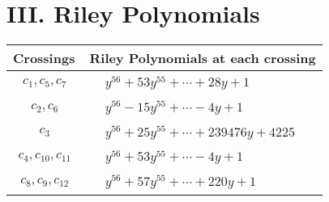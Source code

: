 \documentclass[1p]{elsarticle_modified}
\theoremstyle{definition}
\begin{document}
\centering \section*{ III. Riley Polynomials}
\begin{tabular}{m{50pt}|m{274pt}}
Crossings & \hspace{64pt}Riley Polynomials at each crossing \\
\hline $$\begin{aligned}c_{1},c_{5},c_{7}\end{aligned}$$&$\begin{aligned}
&y^{56}+53 y^{55}+\cdots+28 y+1
\end{aligned}$\\
\hline $$\begin{aligned}c_{2},c_{6}\end{aligned}$$&$\begin{aligned}
&y^{56}-15 y^{55}+\cdots-4 y+1
\end{aligned}$\\
\hline $$\begin{aligned}c_{3}\end{aligned}$$&$\begin{aligned}
&y^{56}+25 y^{55}+\cdots+239476 y+4225
\end{aligned}$\\
\hline $$\begin{aligned}c_{4},c_{10},c_{11}\end{aligned}$$&$\begin{aligned}
&y^{56}+53 y^{55}+\cdots-4 y+1
\end{aligned}$\\
\hline $$\begin{aligned}c_{8},c_{9},c_{12}\end{aligned}$$&$\begin{aligned}
&y^{56}+57 y^{55}+\cdots+220 y+1
\end{aligned}$\\
\hline
\end{tabular}
\vskip 2pc
\end{document}
